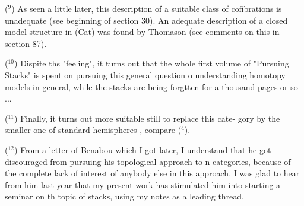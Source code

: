 ($^9$)   As seen a little later,  this  description of a suitable class of
cofibrations is unadequate (see  beginning of section 30).  An adequate
description of a closed model structure in (Cat) was found by \uline{Thomason}
(see comments on this in section 87).

($^{10}$)   Dispite ths "feeling",  it turns out that the whole first volume
of "Pursuing Stacks" is spent on pursuing this general question o
understanding homotopy models in general,   while the stacks
are being forgtten  for a thousand pages or so ...

($^{11}$)   Finally,  it turns out more suitable still to replace this cate-%
gory by the  smaller one of standard hemispheres ,  compare ($^4$).

($^{12}$)   From a letter of Benabou which I got later,  I understand that he
got discouraged from pursuing his topological approach to n-categories,
because of the complete lack of interest of anybody else in this approach.
I was glad to hear from him last year that my present work has stimulated
him into starting a seminar on th topic of stacks,  using my notes as a
leading thread.

